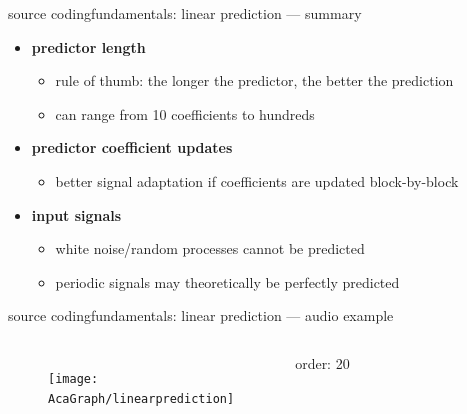 	\begin{frame}{source coding}{fundamentals: linear prediction --- summary}
		\begin{itemize}
			\item 	\textbf{predictor length}
				\begin{itemize}
					\item	rule of thumb: the longer the predictor, the better the prediction
					\item	can range from 10 coefficients to hundreds
				\end{itemize}
			\pause
            \bigskip
			\item	\textbf{predictor coefficient updates}
				\begin{itemize}
					\item	better signal adaptation if coefficients are updated block-by-block
				\end{itemize}
			\pause
            \bigskip
			\item	\textbf{input signals}
				\begin{itemize}
					\item	white noise/random processes cannot be predicted
					\item	periodic signals may theoretically be perfectly predicted
				\end{itemize}
		\end{itemize}
	\end{frame}
	\begin{frame}{source coding}{fundamentals: linear prediction --- audio example}
        \begin{columns}
			\begin{figure}
				\centering
					\texttt{[image: \\AcaGraph/linearprediction]}
			\end{figure}
                
                \bigskip
                \bigskip
                \bigskip
                order: 20 
                
                \bigskip
                \bigskip
                \bigskip
			\end{columns}
	\end{frame}

